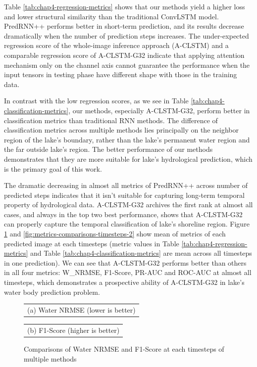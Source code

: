 Table \ref{tab:chap4-regression-metrics} shows that our methods yield a higher loss and lower structural similarity than the traditional ConvLSTM model. PredRNN++ performs better in short-term prediction, and its results decrease dramatically when the number of prediction steps increases. The under-expected regression score of the whole-image inference approach (A-CLSTM) and a comparable regression score of A-CLSTM-G32 indicate that applying attention mechanism only on the channel axis cannot guarantee the performance when the input tensors in testing phase have different shape with those in the training data. 

In contrast with the low regression scores, as we see in Table \ref{tab:chap4-classification-metrics}, our methods, especially A-CLSTM-G32, perform better in classification metrics than traditional RNN methods. The difference of classification metrics across multiple methods lies principally on the neighbor region of the lake's boundary, rather than the lake's permanent water region and the far outside lake's region. The better performance of our methods demonstrates that they are more suitable for lake's hydrological prediction, which is the primary goal of this work.

The dramatic decreasing in almost all metrics of PredRNN++ across number of predicted steps indicates that it isn't suitable for capturing long-term temporal property of hydrological data. A-CLSTM-G32 archives the first rank at almost all cases, and always in the top two best performance, shows that A-CLSTM-G32 can properly capture the temporal classification of lake's shoreline region. Figure \ref{fig:metrics-comparisons-timesteps-1} and \ref{fig:metrics-comparisons-timesteps-2} show mean of metrics of each predicted image at each timesteps (metric values in Table \ref{tab:chap4-regression-metrics} and Table \ref{tab:chap4-classification-metrics} are mean across all timesteps in one prediction). We can see that A-CLSTM-G32 performs better than others in all four metrics: W\_NRMSE,  F1-Score, PR-AUC and ROC-AUC at almost all timesteps, which demonstrates a prospective ability of A-CLSTM-G32 in lake's water body prediction problem.

\begin{figure}[h!]
    \begin{center}
    \begin{tabular}[b]{c}
       \\
      \small (a) Water NRMSE (lower is better)
    \end{tabular}
    \begin{tabular}[b]{c}
       \\
      \small (b) F1-Score (higher is better)
    \end{tabular}
    \end{center}
    \caption{Comparisons of Water NRMSE and F1-Score at each timesteps of multiple methods}
\label{fig:metrics-comparisons-timesteps-1}
\end{figure}

